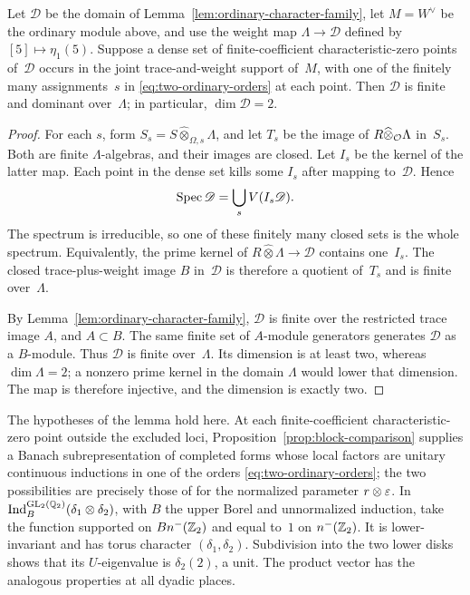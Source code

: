 \begin{lemma}\label{lem:joint-image}
Let $\mathscr D$ be the domain of
Lemma~\ref{lem:ordinary-character-family}, let $M=W^\vee$ be the
ordinary module above, and use the weight map
$\Lambda\to\mathscr D$ defined by $[5]\mapsto\eta_1(5)$.
Suppose a dense set of finite-coefficient characteristic-zero points
of~$\mathscr D$ occurs in the joint trace-and-weight support of~$M$,
with one of the finitely many assignments~$s$ in
\eqref{eq:two-ordinary-orders} at each point.  Then
$\mathscr D$ is finite and dominant over~$\Lambda$; in particular,
$\dim\mathscr D=2$.
\end{lemma}
\begin{proof}
For each $s$, form $S_s=S\widehat\otimes_{\Omega,s}\Lambda$, and let
$T_s$ be the image of $R\widehat\otimes_{\mathcal O}\Lambda$ in~$S_s$.
Both are finite $\Lambda$-algebras, and their images are closed.  Let
$I_s$ be the kernel of the latter map.  Each point in the dense set
kills some $I_s$ after mapping to~$\mathscr D$.  Hence
\[
 \operatorname{Spec}\mathscr D=\bigcup_s V(I_s\mathscr D).
\]
The spectrum is irreducible, so one of these finitely many closed sets
is the whole spectrum.  Equivalently, the prime kernel of
$R\widehat\otimes\Lambda\to\mathscr D$ contains one~$I_s$.
The closed trace-plus-weight image $B$ in~$\mathscr D$ is therefore a
quotient of~$T_s$ and is finite over~$\Lambda$.

By Lemma~\ref{lem:ordinary-character-family}, $\mathscr D$ is finite
over the restricted trace image $A$, and $A\subset B$.  The same finite
set of $A$-module generators generates $\mathscr D$ as a $B$-module.
Thus $\mathscr D$ is finite over~$\Lambda$.  Its dimension is at least
two, whereas $\dim\Lambda=2$; a nonzero prime kernel in the domain
$\Lambda$ would lower that dimension.  The map is therefore injective,
and the dimension is exactly two.
\end{proof}

The hypotheses of the lemma hold here.  At each finite-coefficient
characteristic-zero point outside the excluded loci,
Proposition~\ref{prop:block-comparison}
supplies a Banach subrepresentation of completed forms whose local
factors are unitary continuous inductions in one of the orders
\eqref{eq:two-ordinary-orders}; the two possibilities are precisely
those of \cite[Corollary~6.10(3)]{PaskunasTung2021}
for the normalized parameter $r\otimes\varepsilon$.
In $\operatorname{Ind}_B^{\operatorname{GL}_2(\mathbb Q_2)}(\delta_1\otimes\delta_2)$, with $B$ the
upper Borel and unnormalized induction, take the function supported
on $Bn^-(\mathbb Z_2)$ and equal to~$1$ on $n^-(\mathbb Z_2)$.
It is lower-invariant and has torus character $(\delta_1,\delta_2)$.
Subdivision into the two lower disks shows that its $U$-eigenvalue is
$\delta_2(2)$, a unit.  The product vector has the analogous properties
at all dyadic places.

